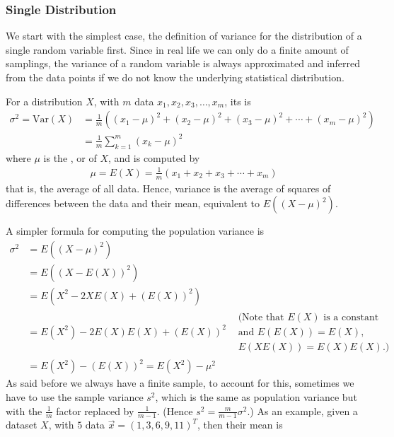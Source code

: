 \subsubsection{Single Distribution}
We start with the simplest case, the definition of variance for the distribution of a single random variable first. Since in real life we can only do a finite amount of samplings, the variance of a random variable is always approximated and inferred from the data points if we do not know the underlying statistical distribution.
\begin{defn}
\label{defn:variance}
For a distribution $X$, with $m$ data $x_1, x_2, x_3, \ldots, x_m$, its  is
\begin{align*}
\sigma^2 = \text{Var}(X) &= \frac{1}{m} ((x_1 - \mu)^2 + (x_2 - \mu)^2 + (x_3 - \mu)^2 + \cdots + (x_m - \mu)^2) \\
&= \frac{1}{m} \sum_{k=1}^m (x_k - \mu)^2
\end{align*}
where $\mu$ is the , or  of $X$, and is computed by
\begin{align*}
\mu = E(X) = \frac{1}{m} (x_1 + x_2 + x_3 + \cdots + x_m)
\end{align*}
that is, the average of all data. Hence, variance is the average of squares of differences between the data and their mean, equivalent to $E((X-\mu)^2)$.
\end{defn}
A simpler formula for computing the population variance is
\begin{align*}
\sigma^2 &= E((X-\mu)^2) \\
&= E((X-E(X))^2) \\
&= E(X^2-2XE(X)+(E(X))^2) \\
&= E(X^2) - 2E(X)E(X) + (E(X))^2 & \begin{aligned}\text{(Note that $E(X)$ is a constant}\\ \text{and $E(E(X)) = E(X)$,} \\
\text{$E(XE(X)) = E(X)E(X)$.)}\end{aligned} \\
&= E(X^2) - (E(X))^2 = E(X^2) - \mu^2
\end{align*}
As said before we always have a finite sample, to account for this, sometimes we have to use the sample variance $s^2$, which is the same as population variance but with the $\frac{1}{m}$ factor replaced by $\frac{1}{m-1}$. (Hence $s^2 = \frac{m}{m-1}\sigma^2$.) As an example, given a dataset $X$, with $5$ data $\vec{x} = (1, 3, 6, 9, 11)^T$, then their mean is

